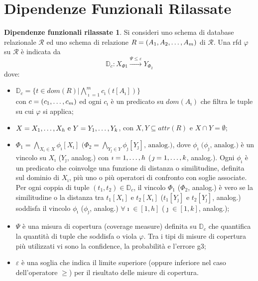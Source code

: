\section{Dipendenze Funzionali Rilassate}
\theoremstyle{definition}
\newtheorem{rfddef}{Dipendenze funzionali rilassate}
\begin{rfddef}\label{def:rfd}
Si consideri uno schema di database relazionale $\mathcal{R}$ ed uno schema di relazione $R = (A_1, A_2,\text{\textellipsis}, A_m)$ di $\mathcal{R}$. Una \acrshort{rfd} $\varphi$ su $\mathcal{R}$ \`{e} indicata da
\begin{equation}
    \mathbb{D}_c : X_{\Phi1} \xrightarrow{\Psi\leq\varepsilon} Y_{\Phi_2}
\end{equation}
dove:
\begin{itemize}
    \item $\mathbb{D}_c=\{t \in dom(R) | \bigwedge\limits_{\imath=1}^{m}c_{\imath}(t[A_{\imath}])\}$
    \\con $c=(c_1,\text{\textellipsis},c_m)$ ed ogni $c_\imath$ \`{e} un predicato su $dom(A_\imath)$ che filtra le tuple su cui $\varphi$ si applica;
    \item $X=X_1,\text{\textellipsis},X_h \text{ e } Y=Y_1,\text{\textellipsis},Y_k$, con $X,Y\subseteq attr(R)$ e $X\cap Y=\emptyset$;
    \item $\Phi_1=\bigwedge\limits_{X_\imath \in X}\phi_\imath[X_\imath] \text{ (} \Phi_2=\bigwedge\limits_{Y_\jmath \in Y}\phi_\jmath[Y_\jmath] \text{, analog.)}$, dove $\phi_\imath \text{ (}\phi_\jmath\text{, analog.)}$ \`{e} un vincolo su $X_\imath$ ($Y_\jmath$, analog.) con $\imath=1,\text{\textellipsis},h$ ($\jmath=1,\text{\textellipsis},k$, analog.). Ogni $\phi_\imath$ \`{e} un predicato che coinvolge una funzione di distanza o similitudine, definita sul dominio di $X_\imath$, pi\`{u} uno o pi\`{u} operatori di confronto con soglie associate. Per ogni coppia di tuple $(t_1,t_2)\in\mathbb{D}_c$, il vincolo $\Phi_1$ ($\Phi_2$, analog.) \`{e} vero se la similitudine o la distanza tra $t_1[X_\imath]$ e $t_2[X_\imath]$ ($t_1[Y_\jmath]$ e $t_2[Y_\jmath]$, analog.) soddisfa il vincolo $\phi_\imath$ ($\phi_\jmath$, analog.) $\forall \imath \in [1,h]$ ($\jmath \in [1,k]$, analog.);
    \item $\Psi$ \`{e} una misura di copertura (coverage measure) definita su $\mathbb{D}_c$ che quantifica la quantit\`{a} di tuple che soddisfa o viola $\varphi$. Tra i tipi di misure di copertura pi\`{u} utilizzati vi sono la confidence, la probabilit\`{a} e l'errore g3;
    \item $\varepsilon$ \`{e} una soglia che indica il limite superiore (oppure inferiore nel caso dell'operatore $\geq$) per il risultato delle misure di copertura.
\end{itemize}
\end{rfddef}
